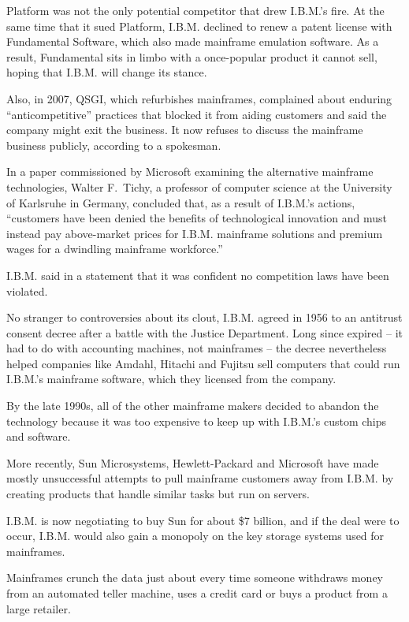 \documentclass[12pt,a4paper,onecolumn]{article}
\begin{document}
\begin{CJK*}{GBK}{song}
Platform was not the only potential competitor that drew I.B.M.'s fire. At the same time that it
sued Platform, I.B.M. declined to renew a patent license with Fundamental Software, which also made
mainframe emulation software. As a result, Fundamental sits in limbo with a once-popular product it
cannot sell, hoping that I.B.M. will change its stance.

Also, in 2007, QSGI, which refurbishes mainframes, complained about enduring ``anticompetitive''
practices that blocked it from aiding customers and said the company might exit the business. It now
refuses to discuss the mainframe business publicly, according to a spokesman.

In a paper commissioned by Microsoft examining the alternative mainframe technologies, Walter
F.~Tichy, a professor of computer science at the University of Karlsruhe in Germany, concluded that,
as a result of I.B.M.'s actions, ``customers have been denied the benefits of technological
innovation and must instead pay above-market prices for I.B.M. mainframe solutions and premium wages
for a dwindling mainframe workforce.''

I.B.M. said in a statement that it was confident no competition laws have been violated.

No stranger to controversies about its clout, I.B.M. agreed in 1956 to an antitrust consent decree
after a battle with the Justice Department. Long since expired -- it had to do with accounting
machines, not mainframes -- the decree nevertheless helped companies like Amdahl, Hitachi and
Fujitsu sell computers that could run I.B.M.'s mainframe software, which they licensed from the
company.

By the late 1990s, all of the other mainframe makers decided to abandon the technology because it
was too expensive to keep up with I.B.M.'s custom chips and software.

More recently, Sun Microsystems, Hewlett-Packard and Microsoft have made mostly unsuccessful
attempts to pull mainframe customers away from I.B.M. by creating products that handle similar tasks
but run on servers.

I.B.M. is now negotiating to buy Sun for about \$7 billion, and if the deal were to occur, I.B.M.
would also gain a monopoly on the key storage systems used for mainframes.

Mainframes crunch the data just about every time someone withdraws money from an automated teller
machine, uses a credit card or buys a product from a large retailer.


\end{CJK*}
\end{document}
